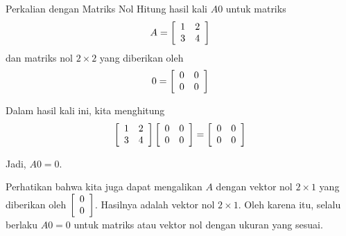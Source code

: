 \begin{example}{Perkalian dengan Matriks Nol}\label{exa:multbyzeromatrix}
Hitung hasil kali $A0$ untuk matriks
\begin{equation*}
A=
\left[
\begin{array}{rr}
1 & 2 \\
3 & 4
\end{array}
\right]
\end{equation*}
dan matriks nol $2 \times 2$ yang diberikan oleh
\begin{equation*}
0=
\left[
\begin{array}{rr}
0 & 0 \\
0 & 0
\end{array}
\right]
\end{equation*}
\end{example}

\begin{solution} 
Dalam hasil kali ini, kita menghitung
\begin{equation*}
\left[
\begin{array}{rr}
1 & 2 \\
3 & 4
\end{array}
\right]
\left[
\begin{array}{rr}
0 & 0 \\
0 & 0
\end{array}
\right]
=
\left[
\begin{array}{rr}
0 & 0 \\
0 & 0
\end{array}
\right]
\end{equation*}

Jadi, $A0=0$. 
\end{solution}

Perhatikan bahwa kita juga dapat mengalikan $A$ dengan vektor nol $2 \times 1 $ yang diberikan oleh $\left[
\begin{array}{r}
0 \\
0
\end{array}
\right]$.
Hasilnya adalah vektor nol $2 \times 1$.
Oleh karena itu, selalu berlaku $A0=0$ untuk matriks atau vektor nol dengan ukuran yang sesuai.
